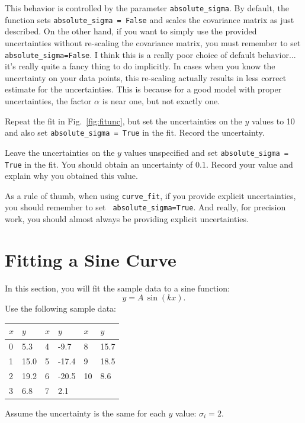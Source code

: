 This behavior is controlled by the parameter {\tt absolute{\_}sigma}.
By default, the function sets {\tt absolute{\_}sigma = False} and
scales the covariance matrix as just described.  On the other hand, if
you want to simply use the provided uncertainties without re-scaling
the covariance matrix, you must remember to set {\tt
  absolute{\_}sigma=False}.  I think this is a really poor choice of
default behavior...  it's really quite a fancy thing to do implicitly.
In cases when you know the uncertainty on your data points, this
re-scaling actually results in less correct estimate for the
uncertainties.  This is because for a good model with proper
uncertainties, the factor $\alpha$ is near one, but not exactly one.



\begin{plot}
Repeat the fit in Fig.~\ref{fig:fitunc}, but
set the uncertainties on the $y$ values to 10 and also set 
{\tt absolute{\_}sigma = True} in the fit.  Record the uncertainty.
\end{plot}

\begin{plot}
Leave the uncertainties on the $y$ values
unspecified and set {\tt absolute{\_}sigma = True} in the fit.  You
should obtain an uncertainty of $0.1$.  Record your value and explain
why you obtained this value.
\end{plot}

As a rule of thumb, when using {\tt curve{\_}fit}, if you provide
explicit uncertainties, you should remember to set {\tt
  absolute{\_}sigma=True}.  And really, for precision work, you should
almost always be providing explicit uncertainties.

\section{Fitting a Sine Curve}

In this section, you will fit the sample data to a sine function:
\begin{displaymath}
 y = A \, \sin( k x). 
\end{displaymath}
Use the following sample data:\\
\begin{center}
\begin{tabular}{|ll| ll|ll|}
\hline
$x$ & $y$ & $x$ & $y$ & $x$ & $y$\\
\hline
0  & 5.3    & 4  & -9.7   & 8  & 15.7  \\
1  & 15.0   & 5  & -17.4  & 9  & 18.5  \\
2  & 19.2   & 6  & -20.5  & 10 & 8.6   \\
3  & 6.8    & 7  &  2.1   & &  \\
\hline
\end{tabular}
\end{center}
Assume the uncertainty is the same for each $y$ value: $\sigma_i = 2$.

